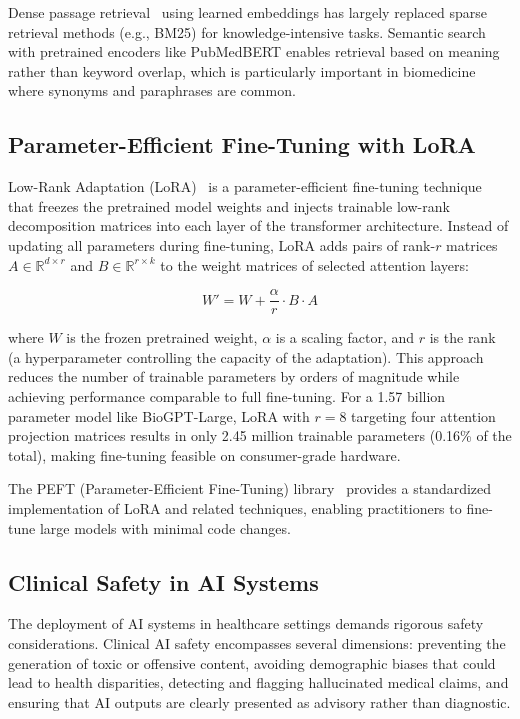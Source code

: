\documentclass[conference]{IEEEtran}
\begin{document}
Dense passage retrieval~\cite{karpukhin2020dense} using learned embeddings has largely replaced sparse retrieval methods (e.g., BM25) for knowledge-intensive tasks. Semantic search with pretrained encoders like PubMedBERT enables retrieval based on meaning rather than keyword overlap, which is particularly important in biomedicine where synonyms and paraphrases are common.

\subsection{Parameter-Efficient Fine-Tuning with LoRA}

Low-Rank Adaptation (LoRA)~\cite{hu2022lora} is a parameter-efficient fine-tuning technique that freezes the pretrained model weights and injects trainable low-rank decomposition matrices into each layer of the transformer architecture. Instead of updating all parameters during fine-tuning, LoRA adds pairs of rank-$r$ matrices $A \in \mathbb{R}^{d \times r}$ and $B \in \mathbb{R}^{r \times k}$ to the weight matrices of selected attention layers:

\begin{equation}
    W' = W + \frac{\alpha}{r} \cdot B \cdot A
\end{equation}

where $W$ is the frozen pretrained weight, $\alpha$ is a scaling factor, and $r$ is the rank (a hyperparameter controlling the capacity of the adaptation). This approach reduces the number of trainable parameters by orders of magnitude while achieving performance comparable to full fine-tuning. For a 1.57 billion parameter model like BioGPT-Large, LoRA with $r=8$ targeting four attention projection matrices results in only 2.45 million trainable parameters (0.16\% of the total), making fine-tuning feasible on consumer-grade hardware.

The PEFT (Parameter-Efficient Fine-Tuning) library~\cite{peft2023} provides a standardized implementation of LoRA and related techniques, enabling practitioners to fine-tune large models with minimal code changes.

\subsection{Clinical Safety in AI Systems}

The deployment of AI systems in healthcare settings demands rigorous safety considerations. Clinical AI safety encompasses several dimensions: preventing the generation of toxic or offensive content, avoiding demographic biases that could lead to health disparities, detecting and flagging hallucinated medical claims, and ensuring that AI outputs are clearly presented as advisory rather than diagnostic.
\end{document}

